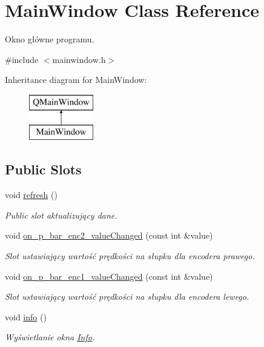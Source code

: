 \hypertarget{class_main_window}{}\section{Main\+Window Class Reference}
\label{class_main_window}


Okno główne programu.  




{\ttfamily \#include $<$mainwindow.\+h$>$}

Inheritance diagram for Main\+Window\+:\begin{figure}[H]
\begin{center}
\leavevmode
\includegraphics[height=2.000000cm]{class_main_window}
\end{center}
\end{figure}
\subsection*{Public Slots}
\begin{DoxyCompactItemize}
\item 
void \hyperlink{class_main_window_ab27297114529e4c16d6d8d7a54927a0e}{refresh} ()
\begin{DoxyCompactList}\small\item\em Public slot aktualizujący dane. \end{DoxyCompactList}\item 
void \hyperlink{class_main_window_af7a712e76f56484c9e364f49279a646d}{on\+\_\+p\+\_\+bar\+\_\+enc2\+\_\+value\+Changed} (const int \&value)
\begin{DoxyCompactList}\small\item\em Slot ustawiający wartość prędkości na słupku dla encodera prawego. \end{DoxyCompactList}\item 
void \hyperlink{class_main_window_a8e2c589784d7a28d72386d23bd51b683}{on\+\_\+p\+\_\+bar\+\_\+enc1\+\_\+value\+Changed} (const int \&value)
\begin{DoxyCompactList}\small\item\em Slot ustawiający wartość prędkości na słupku dla encodera lewego. \end{DoxyCompactList}\item 
void \hyperlink{class_main_window_a78f945084286506a64269d4ee75db224}{info} ()
\begin{DoxyCompactList}\small\item\em Wyświetlanie okna \hyperlink{class_info}{Info}. \end{DoxyCompactList}\end{DoxyCompactItemize}
